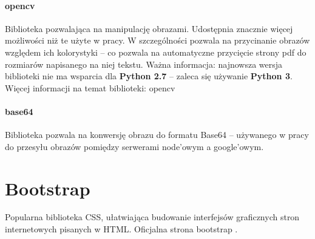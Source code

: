 \paragraph{opencv} Biblioteka pozwalająca na manipulację obrazami. Udostępnia znacznie więcej możliwości niż te użyte w pracy. W szczególności pozwala na przycinanie obrazów względem ich kolorystyki -- co pozwala na automatyczne przycięcie strony pdf do rozmiarów napisanego na niej tekstu. Ważna informacja: najnowsza wersja biblioteki nie ma wsparcia dla \textbf{Python 2.7} -- zaleca się używanie \textbf{Python 3}. Więcej informacji na temat biblioteki: opencv \cite{opencv}
\paragraph{base64} Biblioteka pozwala na konwersję obrazu do formatu Base64 -- używanego w pracy do przesyłu obrazów pomiędzy serwerami node'owym a google'owym. 

\section{Bootstrap}  
Popularna biblioteka CSS, ułatwiająca budowanie interfejsów graficznych stron internetowych pisanych w HTML. Oficjalna strona bootstrap \cite{bootstrap}.




